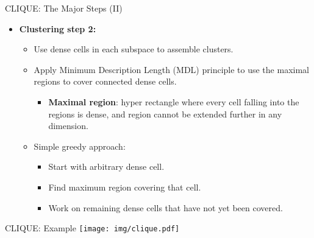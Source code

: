 \begin{frame}{CLIQUE: The Major Steps (II)}
	\begin{itemize}
		\item \textbf{Clustering step 2:}
		      \begin{itemize}
			      \item Use dense cells in each subspace to assemble clusters.
			      \item Apply Minimum Description Length (MDL) principle to use the
			            maximal regions to cover connected dense cells.
			            \begin{itemize}
				            \item \textbf{\color{airforceblue}Maximal region}: hyper
				                  rectangle where every cell falling into the regions is dense,
				                  and region cannot be extended further in any dimension.
			            \end{itemize}
			      \item Simple greedy approach:
			            \begin{itemize}
				            \item Start with arbitrary dense cell.
				            \item Find maximum region covering that cell.
				            \item Work on remaining dense cells that have not yet been
				                  covered.
			            \end{itemize}
		      \end{itemize}
	\end{itemize}
\end{frame}

\begin{frame}{CLIQUE: Example}
	\centering
	\texttt{[image: img/clique.pdf]}
\end{frame}

